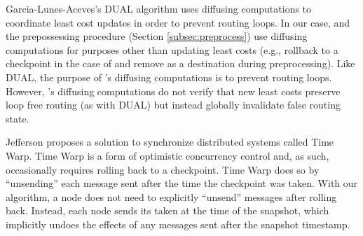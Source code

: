 Garcia-Lunes-Aceves's DUAL algorithm \cite{JJ93} uses diffusing computations to coordinate least cost updates in order to prevent routing loops. 
In our case, \cpr and the prepossessing procedure (Section \ref{subsec:preprocess}) use diffusing computations for purposes other than updating least costs 
(e.g., rollback to a checkpoint in the case of \cpr
and remove \bad as a destination during preprocessing). Like DUAL, the purpose of \purges's diffusing computations is to prevent routing loops.  However, \purges's diffusing computations
do not verify that new least costs preserve loop free routing (as with DUAL) but instead globally invalidate false routing state. 



Jefferson \cite{Jeff} proposes a solution to synchronize distributed systems called Time Warp. Time Warp is a form of optimistic 
concurrency control and, as such, occasionally requires rolling back to a checkpoint. Time Warp does so by ``unsending'' each message sent after the time the checkpoint was taken.
With our \cpr algorithm, a node does not need to explicitly ``unsend'' messages after rolling back.  Instead, each node sends its \minv taken at the time of the snapshot, which
implicitly undoes the effects of any messages sent after the snapshot timestamp.








